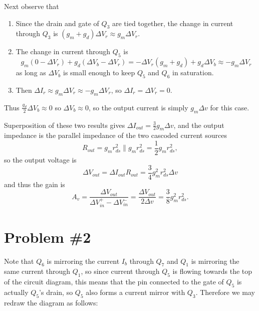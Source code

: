 \documentclass{article}
\begin{document}
Next observe that
\begin{enumerate}
  \item{Since the drain and gate of $Q_3$ are tied together, the change in 
        current through $Q_3$ is 
        $(g_m + g_d) \Delta V_r \approx g_m \Delta V_r$.
       }
  \item{The change in current through $Q_5$ is
        $$
        g_m (0 - \Delta V_r) + g_d (\Delta V_b - \Delta V_r)
      = -\Delta V_r (g_m + g_d) + g_d \Delta V_b \approx -g_m \Delta V_r
        $$
        as long as $\Delta V_b$ is small enough to keep $Q_5$ and $Q_6$ in
        saturation.
       }
   \item{Then $\Delta I_r \approx g_m \Delta V_r \approx -g_m \Delta V_r$, so 
         $\Delta I_r = \Delta V_r = 0$.
        }
\end{enumerate}
Thus $\frac{g_d}{2} \Delta V_b \approx 0$ so $\Delta V_b \approx 0$, so
the output current is simply $g_m \Delta v$ for this case.

Superposition of these two results gives
$\Delta I_{out} = \frac{3}{2} g_m \Delta v$,
and the output impedance is the parallel impedance of the two cascoded
current sources
$$
R_{out} = g_m r_{ds}^2 \| g_m r_{ds}^2 = \frac{1}{2} g_m r_{ds}^2,
$$
so the output voltage is
$$
\Delta V_{out} = \Delta I_{out} R_{out} = \frac{3}{4} g_m^2 r_{ds}^2 \Delta v
$$
and thus the gain is
$$
A_v = \frac{\Delta V_{out}}{\Delta V_{in}^{+} - \Delta V_{in}^{-}} 
    = \frac{\Delta V_{out}}{2 \Delta v} 
    = \frac{3}{8} g_{m}^2 r_{ds}^2.
$$



\section*{Problem \#2}
Note that $Q_6$ is mirroring the current $I_b$ through $Q_7$ and $Q_1$ is
mirroring the same current through $Q_1$, so since current through $Q_5$ is
flowing towards the top of the circuit diagram, this means that the pin 
connected to the gate of $Q_5$ is actually $Q_5$'s drain, so $Q_5$ also forms a
current mirror with $Q_3$. Therefore we may redraw the diagram as follows:
\end{document}
